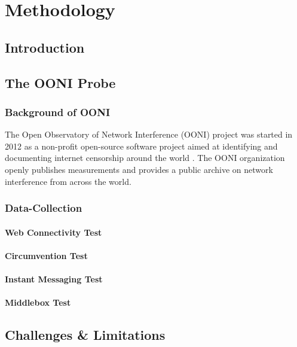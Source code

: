 \chapter{Methodology}
\section{Introduction}



\section{The OONI Probe}

\subsection{Background of OONI}

The Open Observatory of Network Interference (OONI) project was started in 2012 as a non-profit open-source software project aimed at identifying and documenting internet censorship around the world \cite{ooniAbout}. The OONI organization openly publishes measurements and provides a public archive on network interference from across the world. 

\subsection{Data-Collection}



\subsubsection{Web Connectivity Test}



\subsubsection{Circumvention Test}



\subsubsection{Instant Messaging Test}



\subsubsection{Middlebox Test}



\section{Challenges \& Limitations}



